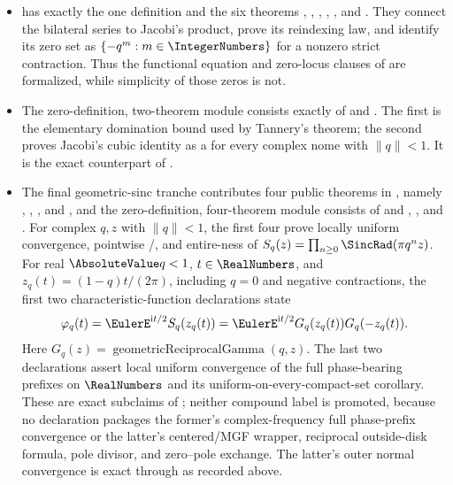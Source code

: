 \documentclass[11pt,a4paper,oneside,openany]{book}
\theoremstyle{definition}
\theoremstyle{remark}
\begin{document}
\begin{itemize}
\item {} has exactly the one definition
 and the six theorems
,
,
,
,
, and
.  They connect the bilateral series
to Jacobi's product, prove its reindexing law, and identify its zero set as
\(\{-q^m:m\in\IntegerNumbers\}\) for a nonzero strict contraction.  Thus the
functional equation and zero-locus clauses of  are
formalized, while simplicity of those zeros is not.

\item The zero-definition, two-theorem module 
consists exactly of  and
.  The first is the elementary domination
bound used by Tannery's theorem; the second proves Jacobi's cubic identity as
a  for every complex nome with \(\lVert q\rVert<1\).  It is the
exact counterpart of .

\item The final geometric-sinc tranche contributes four public theorems in
, namely
,
,
, and
, and the zero-definition,
four-theorem module  consists of
and
,
, and
.
For complex $q,z$ with $\lVert q\rVert<1$, the first four prove locally
uniform convergence, pointwise /, and
entire-ness of
$S_q(z)=\prod_{n\ge0}\SincRad(\pi q^nz)$.  For real
$\AbsoluteValue q<1$, $t\in\RealNumbers$, and $z_q(t)=(1-q)t/(2\pi)$, including $q=0$ and
negative contractions, the first two characteristic-function declarations state
\[
 \varphi_q(t)=\EulerE^{\mathrm i t/2}S_q(z_q(t))
 =\EulerE^{\mathrm i t/2}G_q(z_q(t))G_q(-z_q(t)).
\]
Here $G_q(z)=\operatorname{geometricReciprocalGamma}(q,z)$.
The last two declarations assert local uniform convergence of the full
phase-bearing prefixes on \(\RealNumbers\) and its uniform-on-every-compact-set
corollary.
These are exact subclaims of
; neither compound
label is promoted, because no declaration packages the former's
complex-frequency full phase-prefix convergence or the latter's centered/MGF
wrapper, reciprocal outside-disk formula, pole divisor, and zero--pole
exchange.  The latter's outer normal convergence is exact through
 as recorded above.


\end{itemize}
\end{document}

